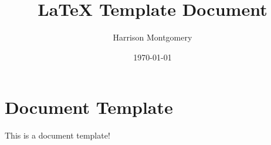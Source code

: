 \documentclass[12pt]{article}
\title{LaTeX Template Document}
\author{Harrison Montgomery}
\date{\today}
\begin{document}
\maketitle
\section{Document Template}
This is a document template! \parencite{paiva_sonic_2018}

\printbibliography
\end{document}
